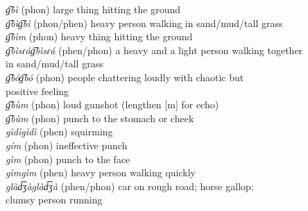 \documentclass[output=paper,colorlinks,citecolor=brown]{langscibook}
\begin{document}
\begin{tabbing}
\textit{g͡bì}                                \>(phon) large thing hitting the ground                                                                     \\
\textit{g͡bìg͡bì}                           \>(phon/phen) heavy person walking in sand/mud/tall grass                                                   \\
\textit{g͡bìm}                               \>(phon) heavy thing hitting the ground                                                                   \\
\textit{g͡bìsɾág͡bìsɾá}                   \>(phen/phon) a heavy and a light person walking together  \\
\> in sand/mud/tall grass                             \\
\textit{g͡bóg͡bó}                           \>(phon) people chattering loudly with chaotic but \\
\> positive feeling                                       \\
\textit{g͡bùm}                               \>(phon) loud gunshot (lengthen {[}m{]} for echo)                                                          \\
\textit{g͡bùm}                               \>(phon) punch to the stomach or cheek                                                                        \\
\textit{gìdìgìdì}                         \>(phen) squirming                                                                                        \\
\textit{gím}                                 \>(phon) ineffective punch                                                                                \\
\textit{gìm}                                 \>(phon) punch to the face                                                                                    \\
\textit{gìmgìm}                             \>(phen) heavy person walking quickly                                                                       \\
\textit{glàd͡ʒàglàd͡ʒà}                   \>(phen/phon) car on rough road; horse gallop; \\
\> clumsy person running                                      \\


\end{tabbing}
\end{document}
